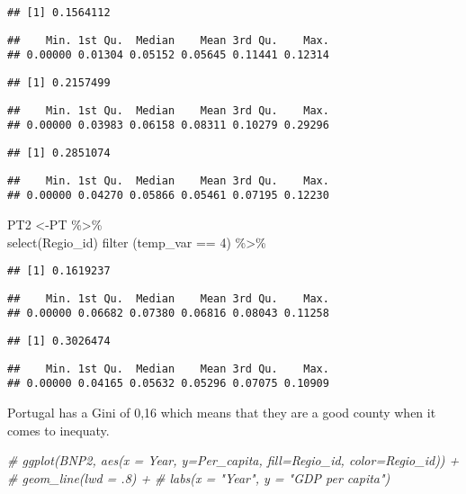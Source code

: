 \documentclass[
]{article}
\newenvironment{Shaded}{\begin{snugshade}}{\end{snugshade}}
\newcommand{\CommentTok}[1]{\textcolor[rgb]{0.56,0.35,0.01}{\textit{#1}}}
\begin{document}
\begin{verbatim}
## [1] 0.1564112
\end{verbatim}

\begin{verbatim}
##    Min. 1st Qu.  Median    Mean 3rd Qu.    Max. 
## 0.00000 0.01304 0.05152 0.05645 0.11441 0.12314
\end{verbatim}

\begin{verbatim}
## [1] 0.2157499
\end{verbatim}

\begin{verbatim}
##    Min. 1st Qu.  Median    Mean 3rd Qu.    Max. 
## 0.00000 0.03983 0.06158 0.08311 0.10279 0.29296
\end{verbatim}

\begin{verbatim}
## [1] 0.2851074
\end{verbatim}

\begin{verbatim}
##    Min. 1st Qu.  Median    Mean 3rd Qu.    Max. 
## 0.00000 0.04270 0.05866 0.05461 0.07195 0.12230
\end{verbatim}

PT2 \textless-PT \%\textgreater\%\\
select(Regio\_id) filter (temp\_var == 4) \%\textgreater\%

\begin{verbatim}
## [1] 0.1619237
\end{verbatim}

\begin{verbatim}
##    Min. 1st Qu.  Median    Mean 3rd Qu.    Max. 
## 0.00000 0.06682 0.07380 0.06816 0.08043 0.11258
\end{verbatim}

\begin{verbatim}
## [1] 0.3026474
\end{verbatim}

\begin{verbatim}
##    Min. 1st Qu.  Median    Mean 3rd Qu.    Max. 
## 0.00000 0.04165 0.05632 0.05296 0.07075 0.10909
\end{verbatim}

Portugal has a Gini of 0,16 which means that they are a good county when
it comes to inequaty.

\begin{Shaded}
\begin{Highlighting}[]
\CommentTok{\#  ggplot(BNP2, aes(x = Year, y=Per\_capita, fill=Regio\_id, color=Regio\_id)) +}
\CommentTok{\#  geom\_line(lwd = .8) +}
\CommentTok{\#   labs(x = "Year", y = "GDP per capita")}
\end{Highlighting}
\end{Shaded}
\end{document}
